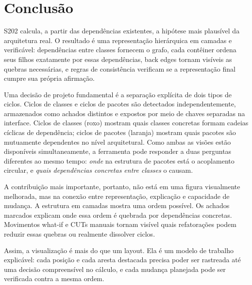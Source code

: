 \documentclass[a4paper,11pt]{article}
\begin{document}
\section{Conclus\~ao}

S202 calcula, a partir das depend\^encias existentes, a hip\'otese mais
plaus\'ivel da arquitetura real. O resultado \'e uma representa\c{c}\~ao
hier\'arquica em camadas e verific\'avel: depend\^encias entre classes
fornecem o grafo, cada cont\^einer ordena seus filhos exatamente por essas
depend\^encias, back edges tornam vis\'iveis as quebras necess\'arias, e regras
de consist\^encia
verificam se a representa\c{c}\~ao final cumpre sua pr\'opria
afirma\c{c}\~ao.

Uma decis\~ao de projeto fundamental \'e a separa\c{c}\~ao expl\'icita de dois
tipos de ciclos. Ciclos de classes e ciclos de pacotes s\~ao detectados
independentemente, armazenados como achados distintos e expostos por meio de
chaves separadas na interface. Ciclos de classes (roxo) mostram quais classes
concretas formam cadeias c\'iclicas de depend\^encia; ciclos de pacotes (laranja)
mostram quais pacotes s\~ao mutuamente dependentes no n\'ivel arquitetural. Como
ambas as vis\~oes est\~ao dispon\'iveis simultaneamente, a ferramenta pode
responder a duas perguntas diferentes ao mesmo tempo: \emph{onde} na estrutura
de pacotes est\'a o acoplamento circular, e \emph{quais depend\^encias concretas
entre classes} o causam.

A contribui\c{c}\~ao mais importante, portanto, n\~ao est\'a em uma figura
visualmente melhorada, mas na conex\~ao entre representa\c{c}\~ao,
explica\c{c}\~ao e capacidade de mudan\c{c}a. A estrutura em camadas mostra uma
ordem poss\'ivel. Os achados marcados explicam onde essa ordem \'e quebrada
por depend\^encias concretas. Movimentos what-if e CUTs manuais tornam
vis\'ivel quais refatora\c{c}\~oes podem reduzir essas quebras ou realmente
dissolver ciclos.

Assim, a visualiza\c{c}\~ao \'e mais do que um layout. Ela \'e um modelo de
trabalho explic\'avel: cada posi\c{c}\~ao e cada aresta destacada precisa poder
ser rastreada at\'e uma decis\~ao compreens\'ivel no c\'alculo, e cada mudan\c{c}a
planejada pode ser verificada contra a mesma ordem.
\end{document}
